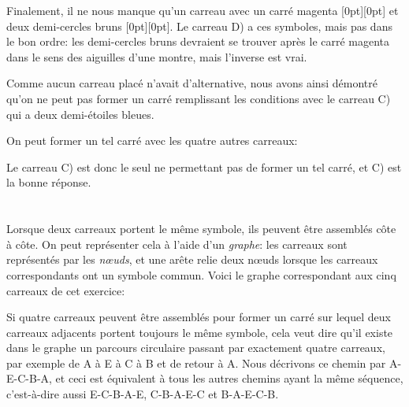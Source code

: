 {{Finalement, il ne nous manque qu’un carreau avec un carré magenta \raisebox{-0.5ex}[0pt][0pt]{} et deux demi-cercles bruns \raisebox{\dimexpr -0.5ex +0.4ex \relax}[0pt][0pt]{}. Le carreau D) a ces symboles, mais pas dans le bon ordre: les demi-cercles bruns devraient se trouver après le carré magenta dans le sens des aiguilles d’une montre, mais l’inverse est vrai.

{\centering%
\par}

Comme aucun carreau placé n’avait d’alternative, nous avons ainsi démontré qu’on ne peut pas former un carré remplissant les conditions avec le carreau C) qui a deux demi-étoiles bleues.

On peut former un tel carré avec les quatre autres carreaux:

{\centering%
\par}

Le carreau C) est donc le seul ne permettant pas de former un tel carré, et C) est la bonne réponse.



\section*{\BrochureItsInformatics}
Lorsque deux carreaux portent le même symbole, ils peuvent être assemblés côte à côte. On peut représenter cela à l’aide d’un \emph{graphe}: les carreaux sont représentés par les \emph{nœuds}, et une arête relie deux nœuds lorsque les carreaux correspondants ont un symbole commun. Voici le graphe correspondant aux cinq carreaux de cet exercice:

{\centering%
\par}

Si quatre carreaux peuvent être assemblés pour former un carré sur lequel deux carreaux adjacents portent toujours le même symbole, cela veut dire qu’il existe dans le graphe un parcours circulaire passant par exactement quatre carreaux, par exemple de A à E à C à B et de retour à A. Nous décrivons ce chemin par A-E-C-B-A, et ceci est équivalent à tous les autres chemins ayant la même séquence, c’est-à-dire aussi E-C-B-A-E, C-B-A-E-C et B-A-E-C-B.

}}
